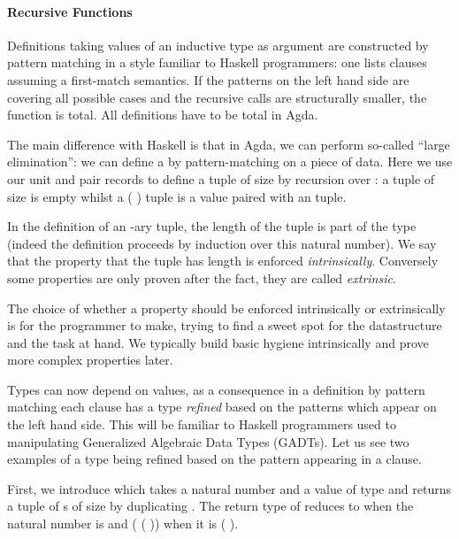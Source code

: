 \paragraph{Recursive Functions}

Definitions taking values of an inductive type as argument are constructed by
pattern matching in a style familiar to Haskell programmers: one lists
clauses assuming a first-match semantics. If the patterns on the left hand
side are covering all possible cases and the recursive calls are structurally
smaller, the function is total. All definitions have to be total in Agda.

The main difference with Haskell is that in Agda, we can perform so-called
``large elimination'': we can define a  by pattern-matching on a
piece of data. Here we use our unit and pair records to define a tuple of
size  by recursion over : a tuple of size  is empty
whilst a ( ) tuple is a value paired with an  tuple.


\begin{technique}
In the definition of an -ary tuple, the length of the tuple is part
of the type (indeed the definition proceeds by induction over this natural
number). We say that the property that the tuple has length  is
enforced \emph{intrinsically}. Conversely some properties are only proven
after the fact, they are called \emph{extrinsic}.

The choice of whether a property should be enforced intrinsically or
extrinsically is for the programmer to make, trying to find a sweet
spot for the datastructure and the task at hand. We typically build
basic hygiene intrinsically and prove more complex properties later.
\end{technique}


Types can now depend on values, as a consequence in a definition by pattern
matching each clause has a type \emph{refined} based on the patterns which appear
on the left hand side. This will be familiar to Haskell programmers used to
manipulating Generalized Algebraic Data Types (GADTs). Let us see two examples of
a type being refined based on the pattern appearing in a clause.

First, we introduce  which takes a natural number  and a value
 of type  and returns a tuple of s of size  by duplicating
. The return type of  reduces to  when the natural number
is  and (  (  )) when it is
( ).

